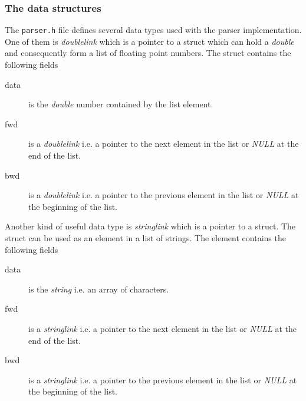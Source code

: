 \documentclass[12pt,a4paper]{report}
\begin{document}
\subsubsection{The data structures}
The \verb+parser.h+ file defines several data types used with the
parser implementation. One of them is {\it doublelink} which is a
pointer to a struct which can hold a {\it double} and consequently
form a list of floating point numbers. The struct contains the
following fields
\begin{description}
\item[data] is the {\it double} number contained by the list element.
\item[fwd] is a {\it doublelink} i.e. a pointer to the next element in
the list or {\it NULL} at the end of the list.
\item[bwd] is a {\it doublelink} i.e. a pointer to the previous element in
the list or {\it NULL} at the beginning of the list.
\end{description}

Another kind of useful data type is {\it stringlink} which is a
pointer to a struct. The struct can be used as an element in a list of
strings. The element contains the following fields
\begin{description}
\item[data] is the {\it string} i.e. an array of characters.
\item[fwd] is a {\it stringlink} i.e. a pointer to the next element in
the list or {\it NULL} at the end of the list.
\item[bwd] is a {\it stringlink} i.e. a pointer to the previous element in
the list or {\it NULL} at the beginning of the list.
\end{description}
\end{document}
